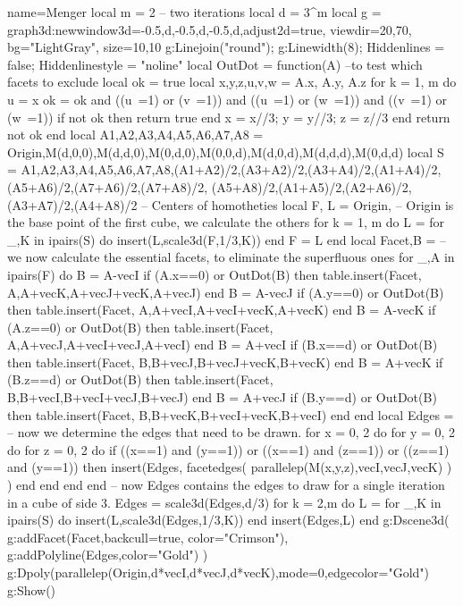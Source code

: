 \documentclass[12pt]{standalone}%
\begin{document}
\begin{luadraw}{name=Menger}
local m = 2 -- two iterations
local d = 3^m
local g = graph3d:new{window3d={-0.5,d,-0.5,d,-0.5,d},adjust2d=true, viewdir={20,70}, bg="LightGray", size={10,10}}
g:Linejoin("round"); g:Linewidth(8); Hiddenlines = false; Hiddenlinestyle = "noline"
local OutDot = function(A) --to test which facets to exclude
    local ok = true
    local x,y,z,u,v,w = A.x, A.y, A.z
    for k = 1, m do
        u = x%
        ok = ok and ((u~=1) or (v~=1)) and ((u~=1) or (w~=1)) and ((v~=1) or (w~=1))
        if not ok then return true end
        x = x//3; y = y//3; z = z//3
    end
    return not ok
end
local A1,A2,A3,A4,A5,A6,A7,A8 = Origin,M(d,0,0),M(d,d,0),M(0,d,0),M(0,0,d),M(d,0,d),M(d,d,d),M(0,d,d)
local S = {A1,A2,A3,A4,A5,A6,A7,A8,(A1+A2)/2,(A3+A2)/2,(A3+A4)/2,(A1+A4)/2,(A5+A6)/2,(A7+A6)/2,(A7+A8)/2, (A5+A8)/2,(A1+A5)/2,(A2+A6)/2,(A3+A7)/2,(A4+A8)/2} -- Centers of homotheties
local F, L = {Origin}, {} -- Origin is the base point of the first cube, we calculate the others
for k = 1, m do
    L = {}
    for _,K in ipairs(S) do
        insert(L,scale3d(F,1/3,K))
    end
    F = L
end
local Facet,B = {} -- we now calculate the essential facets, to eliminate the superfluous ones
for _,A in ipairs(F) do
    B = A-vecI
    if (A.x==0) or OutDot(B) then
        table.insert(Facet, {A,A+vecK,A+vecJ+vecK,A+vecJ})
    end
    B = A-vecJ
    if (A.y==0) or OutDot(B) then
        table.insert(Facet, {A,A+vecI,A+vecI+vecK,A+vecK})
    end
    B = A-vecK
    if (A.z==0) or OutDot(B) then
        table.insert(Facet, {A,A+vecJ,A+vecI+vecJ,A+vecI})
    end
    B = A+vecI
    if (B.x==d) or OutDot(B) then
        table.insert(Facet, {B,B+vecJ,B+vecJ+vecK,B+vecK})
    end
    B = A+vecK
    if (B.z==d) or OutDot(B) then
        table.insert(Facet, {B,B+vecI,B+vecI+vecJ,B+vecJ})
    end
    B = A+vecJ
    if (B.y==d) or OutDot(B) then
        table.insert(Facet, {B,B+vecK,B+vecI+vecK,B+vecI})
    end
end
local Edges = {}  -- now we determine the edges that need to be drawn.
for x = 0, 2 do
    for y = 0, 2 do
        for z = 0, 2 do
            if ((x==1) and (y==1)) or ((x==1) and (z==1)) or ((z==1) and (y==1)) then
                insert(Edges, facetedges( parallelep(M(x,y,z),vecI,vecJ,vecK) ) )
            end
        end
    end
end
-- now Edges contains the edges to draw for a single iteration in a cube of side 3.
Edges = scale3d(Edges,d/3)
for k = 2,m do
    L = {}
    for _,K in ipairs(S) do
        insert(L,scale3d(Edges,1/3,K))
    end
    insert(Edges,L)
end
g:Dscene3d( g:addFacet(Facet,{backcull=true, color="Crimson"}), g:addPolyline(Edges,{color="Gold"}) )
g:Dpoly(parallelep(Origin,d*vecI,d*vecJ,d*vecK),{mode=0,edgecolor="Gold"})
g:Show()
\end{luadraw}
\end{document}
